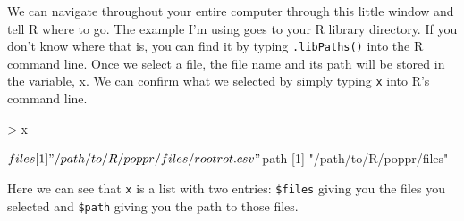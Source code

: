 \documentclass[letterpaper]{article}
\begin{document}
\begin{center}
\end{center}
\newpage

We can navigate throughout your entire computer through this little window and tell R where to go. The example I'm using goes to your R library directory. If you don't know where that is, you can find it by typing \texttt{.libPaths()} into the R command line.
Once we select a file, the file name and its path will be stored in the variable, x. We can confirm what we selected by simply typing \texttt{x} into R's command line.
\begin{Schunk}
\begin{Sinput}
> x
\end{Sinput}
\begin{Soutput}
$files
[1] "/path/to/R/poppr/files/rootrot.csv"

$path
[1] "/path/to/R/poppr/files"
\end{Soutput}
\end{Schunk}
Here we can see that \texttt{x} is a list with two entries: \texttt{\$files} giving you the files you selected and \texttt{\$path} giving you the path to those files. 
\end{document}
